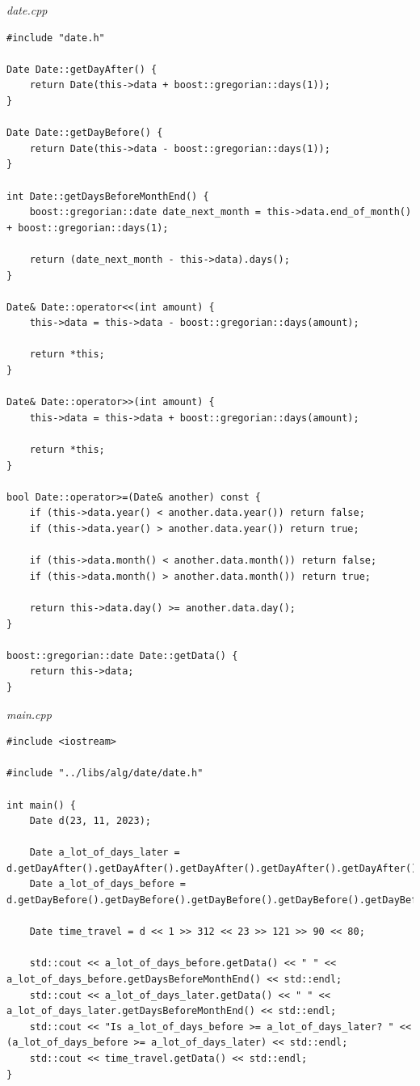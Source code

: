 \documentclass[a4paper,14pt]{extarticle}
\begin{document}
\textit{date.cpp}
\begin{verbatim}
#include "date.h"

Date Date::getDayAfter() {
    return Date(this->data + boost::gregorian::days(1));
}

Date Date::getDayBefore() {
    return Date(this->data - boost::gregorian::days(1));
}

int Date::getDaysBeforeMonthEnd() {
    boost::gregorian::date date_next_month = this->data.end_of_month() + boost::gregorian::days(1);

    return (date_next_month - this->data).days();
}

Date& Date::operator<<(int amount) {
    this->data = this->data - boost::gregorian::days(amount);

    return *this;
}

Date& Date::operator>>(int amount) {
    this->data = this->data + boost::gregorian::days(amount);

    return *this;
}

bool Date::operator>=(Date& another) const {
    if (this->data.year() < another.data.year()) return false;
    if (this->data.year() > another.data.year()) return true;

    if (this->data.month() < another.data.month()) return false;
    if (this->data.month() > another.data.month()) return true;

    return this->data.day() >= another.data.day();
}

boost::gregorian::date Date::getData() {
    return this->data;
}

\end{verbatim}

\textit{main.cpp}
\begin{verbatim}
#include <iostream>

#include "../libs/alg/date/date.h"

int main() {
    Date d(23, 11, 2023);

    Date a_lot_of_days_later = d.getDayAfter().getDayAfter().getDayAfter().getDayAfter().getDayAfter().getDayAfter();
    Date a_lot_of_days_before = d.getDayBefore().getDayBefore().getDayBefore().getDayBefore().getDayBefore();

    Date time_travel = d << 1 >> 312 << 23 >> 121 >> 90 << 80;

    std::cout << a_lot_of_days_before.getData() << " " << a_lot_of_days_before.getDaysBeforeMonthEnd() << std::endl;
    std::cout << a_lot_of_days_later.getData() << " " << a_lot_of_days_later.getDaysBeforeMonthEnd() << std::endl;
    std::cout << "Is a_lot_of_days_before >= a_lot_of_days_later? " << (a_lot_of_days_before >= a_lot_of_days_later) << std::endl;
    std::cout << time_travel.getData() << std::endl;
}

\end{verbatim}
\end{document}
